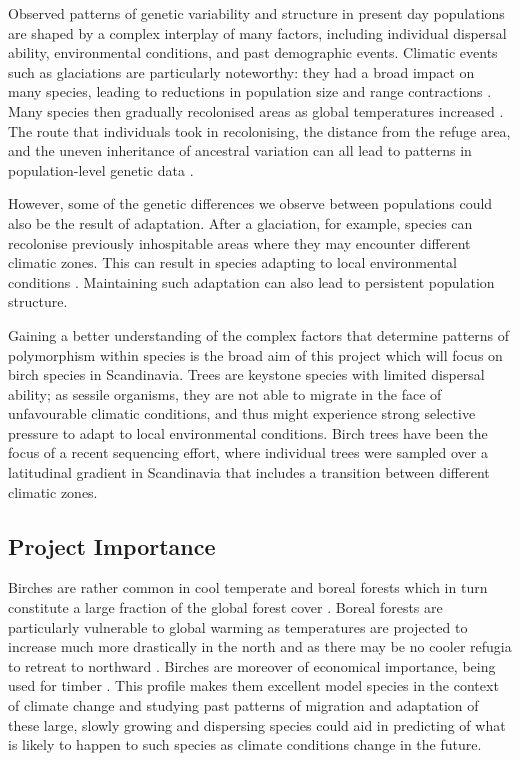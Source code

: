 \documentclass[hidelinks,11pt]{article}
\begin{document}
    Observed patterns of genetic variability and structure in present day populations are shaped by a complex interplay of many factors, including individual dispersal ability, environmental conditions, and past demographic events. Climatic events such as glaciations are particularly noteworthy: they had a broad impact on many species, leading to reductions in population size and range contractions \cite{recolonisation-birch}. Many species then gradually recolonised areas as global temperatures increased \cite{birch-climate-change-treeline}. The route that individuals took in recolonising, the distance from the refuge area, and the uneven inheritance of ancestral variation can all lead to patterns in population-level genetic data \cite{recolonisation-birch}.

    However, some of the genetic differences we observe between populations could also be the result of adaptation. After a glaciation, for example, species can recolonise previously inhospitable areas where they may encounter different climatic zones. This can result in species adapting to local environmental conditions \cite{jarkko}. Maintaining such adaptation can also lead to persistent population structure.

    Gaining a better understanding of the complex factors that determine patterns of polymorphism within species is the broad aim of this project which will focus on birch species in Scandinavia. Trees are keystone species with limited dispersal ability; as sessile organisms, they are not able to migrate in the face of unfavourable climatic conditions, and thus might experience strong selective pressure to adapt to local environmental conditions. Birch trees have been the focus of a recent sequencing effort, where individual trees were sampled over a latitudinal gradient in Scandinavia that includes a transition between different climatic zones.

    \subsection{Project Importance}
    \label{sec:project-importance}

    Birches are rather common in cool temperate and boreal forests which in turn constitute a large fraction of the global forest cover \cite{multispecies-structure-birch}. Boreal forests are particularly vulnerable to global warming as temperatures are projected to increase much more drastically in the north and as there may be no cooler refugia to retreat to northward \cite{jarkko}. Birches are moreover of economical importance, being used for timber \cite{multispecies-structure-birch}. This profile makes them excellent model species in the context of climate change and studying past patterns of migration and adaptation of these large, slowly growing and dispersing species could aid in predicting of what is likely to happen to such species as climate conditions change in the future.
\end{document}
